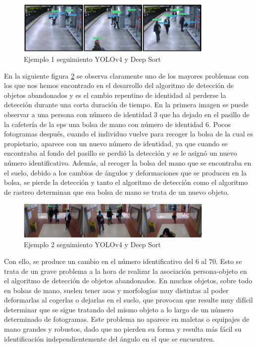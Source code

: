 \begin{figure}[ht]
\centering
\includegraphics[width=0.85\textwidth]{img/chapters/resultados/tracking/avss-tracking-result-example.jpg}
\caption{\label{fig:avss-tracking-example}Ejemplo 1 seguimiento YOLOv4 y Deep Sort \cite{AVSSAB2007-dataset}}
\end{figure}

En la siguiente figura \ref{fig:gba-tracking-example} se observa claramente uno de los mayores problemas con los que nos hemos encontrado en el desarrollo del algoritmo de detección de objetos abandonados y es el cambio repentino de identidad al perderse la detección durante una corta duración de tiempo. En la primera imagen se puede observar a una persona con número de identidad 3 que ha dejado en el pasillo de la cafetería de la \gls{eps} una bolsa de mano con número de identidad 6. Pocos fotogramas después, cuando el individuo vuelve para recoger la bolsa de la cual es propietario, aparece con un nuevo número de identidad, ya que cuando se encontraba al fondo del pasillo se perdió la detección y se le asignó un nuevo número identificativo. Además, al recoger la bolsa del mano que se encontraba en el suelo, debido a los cambios de ángulos y deformaciones que se producen en la bolsa, se pierde la detección y tanto el algoritmo de detección como el algoritmo de rastreo determinan que esa bolsa de mano se trata de un nuevo objeto.

\begin{figure}[ht]
\centering
\includegraphics[width=0.85\textwidth]{img/chapters/resultados/tracking/gba-tracking-result-example.jpg}
\caption{\label{fig:gba-tracking-example}Ejemplo 2 seguimiento YOLOv4 y Deep Sort \cite{gba-dataset}}
\end{figure}

Con ello, se produce un cambio en el número identificativo del 6 al 70. Esto se trata de un grave problema a la hora de realizar la asociación persona-objeto en el algoritmo de detección de objetos abandonados. En muchos objetos, sobre todo en bolsas de mano, suelen tener asas y morfologías muy distintas al poder deformarlas al cogerlas o dejarlas en el suelo, que provocan que resulte muy difícil determinar que se sigue tratando del mismo objeto a lo largo de un número determinado de fotogramas. Este problema no aparece en maletas o equipajes de mano grandes y robustos, dado que no pierden su forma y resulta más fácil su identificación independientemente del ángulo en el que se encuentren.

